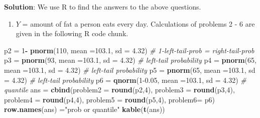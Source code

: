 \documentclass[
]{book}
\newenvironment{Shaded}{\begin{snugshade}}{\end{snugshade}}
\newcommand{\AttributeTok}[1]{\textcolor[rgb]{0.13,0.29,0.53}{#1}}
\newcommand{\CommentTok}[1]{\textcolor[rgb]{0.56,0.35,0.01}{\textit{#1}}}
\newcommand{\DecValTok}[1]{\textcolor[rgb]{0.00,0.00,0.81}{#1}}
\newcommand{\FloatTok}[1]{\textcolor[rgb]{0.00,0.00,0.81}{#1}}
\newcommand{\FunctionTok}[1]{\textcolor[rgb]{0.13,0.29,0.53}{\textbf{#1}}}
\newcommand{\NormalTok}[1]{#1}
\newcommand{\OtherTok}[1]{\textcolor[rgb]{0.56,0.35,0.01}{#1}}
\newcommand{\SpecialCharTok}[1]{\textcolor[rgb]{0.81,0.36,0.00}{\textbf{#1}}}
\newcommand{\StringTok}[1]{\textcolor[rgb]{0.31,0.60,0.02}{#1}}
\providecommand{\tightlist}{%
  \setlength{\itemsep}{0pt}\setlength{\parskip}{0pt}}
\begin{document}
\textbf{Solution}: We use R to find the answers to the above questions.

\begin{enumerate}
\def\labelenumi{\arabic{enumi}.}
\tightlist
\item
  \(Y\) = amount of fat a person eats every day.
  Calculations of problems 2 - 6 are given in the following R code chunk.
\end{enumerate}

\begin{Shaded}
\begin{Highlighting}[]
\NormalTok{p2 }\OtherTok{=} \DecValTok{1}\SpecialCharTok{{-}} \FunctionTok{pnorm}\NormalTok{(}\DecValTok{110}\NormalTok{, }\AttributeTok{mean =}\FloatTok{103.1}\NormalTok{, }\AttributeTok{sd =} \FloatTok{4.32}\NormalTok{)  }\CommentTok{\# 1{-}left{-}tail{-}prob = right{-}tail{-}prob}
\NormalTok{p3 }\OtherTok{=} \FunctionTok{pnorm}\NormalTok{(}\DecValTok{93}\NormalTok{, }\AttributeTok{mean =}\FloatTok{103.1}\NormalTok{, }\AttributeTok{sd =} \FloatTok{4.32}\NormalTok{)      }\CommentTok{\# left{-}tail probability}
\NormalTok{p4 }\OtherTok{=} \FunctionTok{pnorm}\NormalTok{(}\DecValTok{65}\NormalTok{, }\AttributeTok{mean =}\FloatTok{103.1}\NormalTok{, }\AttributeTok{sd =} \FloatTok{4.32}\NormalTok{)      }\CommentTok{\# left{-}tail probability}
\NormalTok{p5 }\OtherTok{=} \FunctionTok{pnorm}\NormalTok{(}\DecValTok{65}\NormalTok{, }\AttributeTok{mean =}\FloatTok{103.1}\NormalTok{, }\AttributeTok{sd =} \FloatTok{4.32}\NormalTok{)      }\CommentTok{\# left{-}tail probability}
\NormalTok{p6 }\OtherTok{=} \FunctionTok{qnorm}\NormalTok{(}\DecValTok{1}\FloatTok{{-}0.05}\NormalTok{, }\AttributeTok{mean =}\FloatTok{103.1}\NormalTok{, }\AttributeTok{sd =} \FloatTok{4.32}\NormalTok{)  }\CommentTok{\# quantile}
\NormalTok{ans }\OtherTok{=} \FunctionTok{cbind}\NormalTok{(}\AttributeTok{problem2 =} \FunctionTok{round}\NormalTok{(p2,}\DecValTok{4}\NormalTok{), }\AttributeTok{problem3 =}  \FunctionTok{round}\NormalTok{(p3,}\DecValTok{4}\NormalTok{), }
            \AttributeTok{problem4 =} \FunctionTok{round}\NormalTok{(p4,}\DecValTok{4}\NormalTok{), }\AttributeTok{problem5 =}  \FunctionTok{round}\NormalTok{(p5,}\DecValTok{4}\NormalTok{), }
            \AttributeTok{problem6=}\NormalTok{ p6)}
\FunctionTok{row.names}\NormalTok{(ans) }\OtherTok{=}\StringTok{"prob or quantile"}
\FunctionTok{kable}\NormalTok{(}\FunctionTok{t}\NormalTok{(ans))}
\end{Highlighting}
\end{Shaded}
\end{document}
